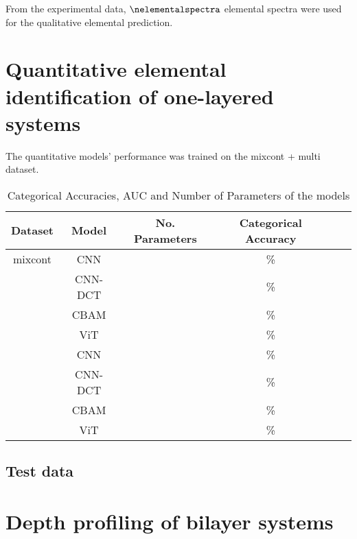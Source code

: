 From the experimental data, $\nelementalspectra$ elemental spectra were used for the qualitative elemental prediction. 


\section{Quantitative elemental identification of one-layered systems}

The quantitative models' performance was trained on the mixcont + multi dataset.

\begin{table}[H]
    \centering
    \begin{tabular}{c|c|c|c|c|c}
        Dataset & Model   & No. Parameters & Categorical Accuracy      \\
        \hline
        mixcont & CNN     &                 &             \% \\
                & CNN-DCT &                 &             \% \\
                & CBAM    &                 &             \% \\
                & ViT     &                 &             \% \\
                & CNN     &                 &             \%  \\
                & CNN-DCT &                 &             \%  \\
                & CBAM    &                 &             \% \\
                & ViT     &                 &             \% \\
    \end{tabular}
    \caption{Categorical Accuracies, AUC and Number of Parameters of the models}
    \label{tab:acc_qual}
\end{table}



\subsection{Test data}

\section{Depth profiling of bilayer systems}


